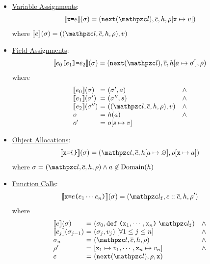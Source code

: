 \begin{itemize}
  \item \underline{Variable Assignments}:
    \[
      \sem{\varx \kweq \expr}(\st) =
      (\getnext(\lab), \ctxts, \heap, \env[\varx \mapsto \val])
    \]
    where $\sem{\expr}(\st) = ((\lab, \ctxts, \heap, \env), \val)$

  \item \underline{Field Assignments}:
    \[
      \sem{\expr_0 \kwsl \expr_1 \kwsr \kweq \expr_2}(\st) =
      (\getnext(\lab), \ctxts, \heap[\addr \mapsto \obj'], \env)
    \]
    where
    \[
      \begin{array}{l@{~}c@{~}ll}
        \sem{\expr_0}(\st) &=& (\st', \addr) &\wedge\\
        \sem{\expr_1}(\st') &=& (\st'', \str) &\wedge\\
        \sem{\expr_2}(\st'') &=& ((\lab, \ctxts, \heap, \env), \val) &\wedge\\
        \obj &=& \heap(\addr) &\wedge\\
        \obj' &=& \obj[\str \mapsto \val]\\
      \end{array}
    \]

  \item \underline{Object Allocations}:
    \[
      \sem{\varx \kweq \kwcl \kwcr}(\st) =
      (\lab, \ctxts, \heap[\addr \mapsto \varnothing], \env[\varx \mapsto
      \addr])
    \]
    where $\st = (\lab, \ctxts, \heap, \env) \wedge \addr \not\in
    \text{Domain}(\heap)$

  \item \underline{Function Calls}:
    \[
      \sem{\varx \kweq \expr \kwrl \expr_1 \cdots \expr_n \kwrr}(\st) =
      (\lab_\varf, \ctxt :: \ctxts, \heap, \env')
    \]
    where
    \[
      \begin{array}{l@{~}c@{~}ll}
        \sem{\expr}(\st) &=& (\st_0, \kwdef \; \kwrl \varx_1, \cdots, \varx_n
        \kwrr \; \lab_\varf) &\wedge\\
        \sem{\expr_j}(\st_{j-1}) &=& (\st_j, \val_j) \;
        [\forall 1 \leq j \leq n] &\wedge\\
        \st_n &=& (\lab, \ctxts, \heap, \env) &\wedge\\
        \env' &=& [\varx_1 \mapsto \val_1, \cdots, \varx_n \mapsto \val_n]
        &\wedge\\
        \ctxt &=& (\getnext(\lab), \env, \varx)\\
      \end{array}
    \]


\end{itemize}
